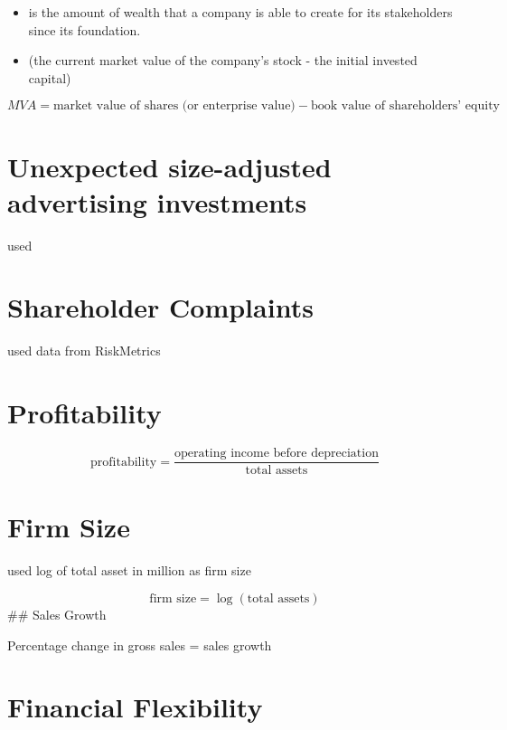 \documentclass[
]{book}
\providecommand{\tightlist}{%
  \setlength{\itemsep}{0pt}\setlength{\parskip}{0pt}}
\begin{document}
\begin{itemize}
\tightlist
\item
  is the amount of wealth that a company is able to create for its stakeholders since its foundation.
\item
  (the current market value of the company's stock - the initial invested capital)
\end{itemize}

\[
MVA = \text{market value of shares (or enterprise value)} - \text{book value of shareholders' equity}
\]

\hypertarget{unexpected-size-adjusted-advertising-investments}{%
\section{Unexpected size-adjusted advertising investments}\label{unexpected-size-adjusted-advertising-investments}}

\citep{Chakravarty_2016, Kim_2011, Liu_2017} used

\hypertarget{shareholder-complaints}{%
\section{Shareholder Complaints}\label{shareholder-complaints}}

\citep{Wies_2019} used data from RiskMetrics

\hypertarget{profitability}{%
\section{Profitability}\label{profitability}}

\citep{Grewal_2008, McAlister_2016}

\[
\text{profitability} = \frac{\text{operating income before depreciation}}{\text{total assets}}
\]

\hypertarget{firm-size}{%
\section{Firm Size}\label{firm-size}}

\citep{Grewal_2010, McAlister_2016, Nezami_2018} used log of total asset in million as firm size

\[
\text{firm size} = \log (\text{total assets})
\] \#\# Sales Growth \citep{Grewal_2010, Nezami_2018, Rao_2004}

Percentage change in gross sales = sales growth

\hypertarget{financial-flexibility}{%
\section{Financial Flexibility}\label{financial-flexibility}}
\end{document}
